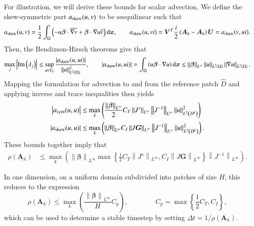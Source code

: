 \documentclass[preprint,10pt]{elsarticle}
\newcommand{\nor}[1]{\left\| #1 \right\|}
\newcommand{\LRp}[1]{\left( #1 \right)}
\newcommand{\LRb}[1]{\left| #1 \right|}
\newcommand{\LRc}[1]{\left\{ #1 \right\}}
\newcommand{\Grad} {\ensuremath{\nabla}}
\renewcommand{\L}{L^2\LRp{\Omega}}
\newcommand{\Dhat}{\widehat{D}}
\newcommand{\reviewerOne}[1]{#1}
\newcommand*\diff[1]{\mathop{}\!{\mathrm{d}#1}}
\begin{document}
\reviewerOne{For illustration, we will derive these bounds for scalar advection.}  We define the skew-symmetric part $a_{\rm skew}(u,v)$ to be sesquilinear such that 
\[
a_{\rm skew}(u,v) = \frac{1}{2}\int_{\Omega} \LRp{-u\bm{\beta}\cdot \overline{\Grad v} + \bm{\beta}\cdot \Grad u \overline{v}}\diff{{\bm{x}}}, \qquad a_{\rm skew}(u,vi) = \bm{V}^T\frac{i}{2} \LRp{\bm{A}_h-\bm{A}_h}\bm{U} = a_{\rm skew}(v,ui).
\]
Then, the Bendixson-Hirsch theorems give that
\[
\max_j \reviewerOne{\LRb{{\rm Im}\LRp{\lambda_j}}} \leq \sup_{u \in V_h} \frac{\LRb{a_{\rm skew}(u,ui)}}{\nor{u}^2_{\L}}, \qquad \LRb{a_{\rm skew}(u,ui)} = \int_{\Omega} \LRp{u\bm{\beta}\cdot \Grad u}\diff{{\bm{x}}} \leq \nor{\bm{\beta}}_{L^\infty}\nor{u}_{\L}\nor{ \Grad u}_{\L}.
\]
Mapping the formulation for advection to and from the reference patch $\Dhat$ and applying inverse and trace inequalities then yields
\begin{align*}
\LRb{a_{\rm sym}(u,u)} 
&\leq \max_k \LRp{\frac{\nor{\bm{\beta}}_{L^\infty}}{2} C_T \nor{J^s}_{L^\infty}\nor{J^{-1}}_{L^\infty} \nor{u}^2_{L^2\LRp{D^k}}} \\
\LRb{a_{\rm skew}(u,u)} &\leq \max_k \LRp{{\nor{\bm{\beta}}_{L^\infty}} C_I \nor{J\bm{G}}_{L^\infty}\nor{J^{-1}}_{L^\infty} \nor{u}^2_{L^2\LRp{D^k}}}.
\end{align*}
These bounds together imply that 
\begin{align*}
\rho\LRp{\bm{A}_h} &\leq \max_k \LRp{\nor{\bm{\beta}}_{L^\infty}\max\LRc{\frac{1}{2} C_T \nor{J^s}_{L^\infty}, C_I \nor{J\bm{G}}_{L^\infty}}\nor{J^{-1}}_{L^\infty}}.
\end{align*}

In one dimension, on a uniform domain subdivided into patches of size \reviewerOne{$H$}, this reduces to the expression
\[
\rho\LRp{\bm{A}_h} \leq \max_k  \LRp{\frac{\nor{\bm{\beta}}_{L^\infty}}{\reviewerOne{H}} C_p}, \qquad \qquad \reviewerOne{C_p = \max\LRc{\frac{1}{2} C_T, C_I}},
\]
which can be used to determine a stable timestep by setting $\Delta t = 1/\rho\LRp{\bm{A}_h}$.  
\end{document}
